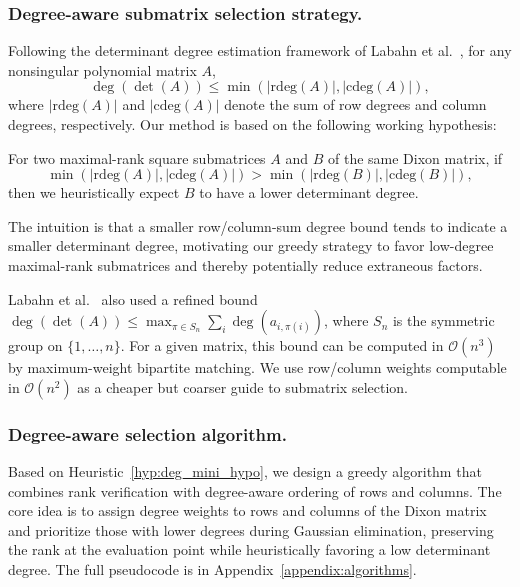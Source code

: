 \subsubsection{Degree-aware submatrix selection strategy.}
Following the determinant degree estimation framework of Labahn et al.~\cite{DBLP:journals/jc/LabahnNZ17}, for any nonsingular polynomial matrix $A$,
\begin{equation*}
	\deg(\det(A)) \leq \min(|\mathrm{rdeg}(A)|, |\mathrm{cdeg}(A)|),
\end{equation*}
where $|\mathrm{rdeg}(A)|$ and $|\mathrm{cdeg}(A)|$ denote the sum of row degrees and column degrees, respectively. Our method is based on the following working hypothesis:

\begin{hypothesis}\label{hyp:deg_mini_hypo}
	For two maximal-rank square submatrices $A$ and $B$ of the same Dixon matrix, if
    \[
      \min(|\mathrm{rdeg}(A)|,|\mathrm{cdeg}(A)|)
      >
      \min(|\mathrm{rdeg}(B)|,|\mathrm{cdeg}(B)|),
    \]
    then we heuristically expect $B$ to have a lower determinant degree.
\end{hypothesis}

The intuition is that a smaller row/column-sum degree bound tends to indicate a smaller determinant degree, motivating our greedy strategy to favor low-degree maximal-rank submatrices and thereby potentially reduce extraneous factors.

\begin{remark}
	Labahn et al.~\cite{DBLP:journals/jc/LabahnNZ17} also used a refined bound $\deg(\det(A)) \le \max_{\pi \in S_n} \sum_{i} \deg(a_{i,\pi(i)})$, where $S_n$ is the symmetric group on $\{1,\ldots,n\}$. For a given matrix, this bound can be computed in $\mathcal{O}(n^3)$ by maximum-weight bipartite matching. We use row/column weights computable in $\mathcal{O}(n^2)$ as a cheaper but coarser guide to submatrix selection.
\end{remark}

\subsubsection{Degree-aware selection algorithm.}
Based on Heuristic~\ref{hyp:deg_mini_hypo}, we design a greedy algorithm that combines rank verification with degree-aware ordering of rows and columns. The core idea is to assign degree weights to rows and columns of the Dixon matrix and prioritize those with lower degrees during Gaussian elimination, preserving the rank at the evaluation point while heuristically favoring a low determinant degree. The full pseudocode is in Appendix~\ref{appendix:algorithms}.

